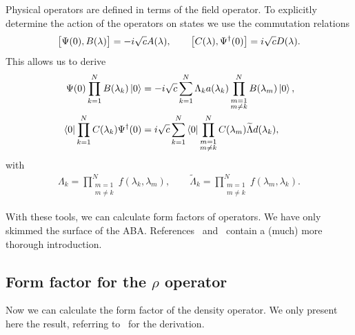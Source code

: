 \documentclass[11pt, a4paper]{report} %
\begin{document}
Physical operators are defined in terms of the field operator.
To explicitly determine the action of the operators on states we use the commutation relations
\begin{align}
  \label{eq:47}
  \qty\big[\Psi(0),B(\lambda)] = -i \sqrt{c} A(\lambda), \qquad \qty[C(\lambda), \Psi^{\dag}(0)] = i \sqrt{c} D(\lambda).
\end{align}
This allows us to derive
\begin{align}
  \label{eq:48}
  \Psi(0) \prod_{k=1}^N B(\lambda_k) \ket{0} &= -i\sqrt{c} \sum_{k=1}^N\Lambda_k a(\lambda_k) \prod_{\substack{m=1\\m\neq k}}^N B(\lambda_m) \ket{0},\\
  \bra{0} \prod_{k=1}^N C(\lambda_k) \Psi^{\dag}(0) &= i \sqrt{c} \sum_{k=1}^N \bra{0} \prod_{\substack{m=1\\m\neq k}}^N C(\lambda_m) \widetilde{\Lambda} d(\lambda_k),
\end{align}
with~\cite{slavnov89_calcul_scalar_produc_wave_funct}
\begin{align}
  \label{eq:49}
  \Lambda_k = \prod_{\substack{m=1\\m\neq k}}^N f(\lambda_k,\lambda_m), \qquad \widetilde{\Lambda}_k = \prod_{\substack{m=1\\m\neq k}}^N f(\lambda_m,\lambda_k).
\end{align}

With these tools, we can calculate form factors of operators.
We have only skimmed the surface of the ABA.\@
References~\cite{Korepin1993} and~\cite{slavnov18_algeb_bethe_ansat} contain a (much) more thorough introduction.


\subsection{Form factor for the \(\rho\) operator}

Now we can calculate the form factor of the density operator.
We only present here the result, referring to~\cite{slavnov90_noneq_time_curren_correl_funct} for the derivation.
\end{document}
